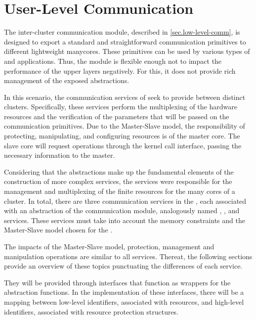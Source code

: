 	\section{User-Level Communication}
	\label{sec.user-level-comm}

		The inter-cluster communication module, described in \autoref{sec.low-level-comm},
		is designed to export a standard and straightforward communication
		primitives to different lightweight manycores.
		These primitives can be used by various types of \oss and applications.
		Thus, the module is flexible enough not to impact the performance
		of the upper layers negatively.
		For this, it does not provide rich management of the exposed abstractions.

		In this scenario, the communication services of \nanvix \microkernel seek
		to provide \ipc between distinct clusters.
		Specifically, these services perform the multiplexing of the hardware
		resources and the verification of the parameters that will be passed
		on the communication primitives.
		Due to the Master-Slave model, the responsibility of protecting,
		manipulating, and configuring \hal resources is of the master core.
		The slave core will request operations through the kernel call interface,
		passing the necessary information to the master.

		Considering that the abstractions make up the fundamental elements of
		the construction of more complex services, the \microkernel services
		were responsible for the management and multiplexing of the finite
		resources for the many cores of a cluster.
		In total, there are three communication services in the \nanvix \microkernel,
		each associated with an abstraction of the communication module,
		analogously named \sync, \mailbox, and \portal services.
		These services must take into account the memory constraints and the
		Master-Slave model chosen for the \microkernel.

		The impacts of the Master-Slave model, protection, management and manipulation 
		operations are similar to all services.
		Thereat, the following sections provide an overview of these topics punctuating 
		the differences of each service.

		They will be provided through interfaces that function as wrappers
		for the \hal abstraction functions.
		In the implementation of these interfaces, there will be a mapping
		between low-level identifiers, associated with \hal resources,
		and high-level identifiers, associated with resource protection structures.

